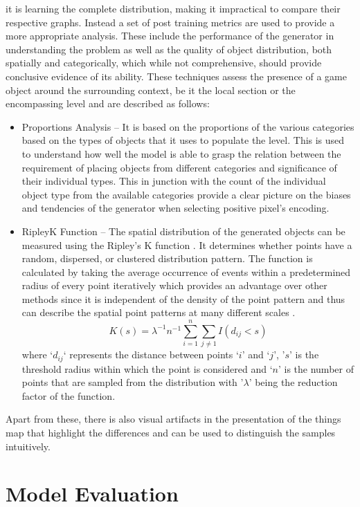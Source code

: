 \documentclass{Configuration_Files/PoliMi3i_thesis}
\begin{document}
it is learning the complete distribution, making it impractical to compare their 
respective graphs. Instead a set of post training metrics are used to provide a more 
appropriate analysis. These include the performance of the generator in 
understanding the problem as well as the quality of object distribution, both spatially 
and categorically, which while not comprehensive, should provide conclusive 
evidence of its ability. These techniques assess the presence of a game object around 
the surrounding context, be it the local section or the encompassing level and are 
described as follows:
\begin{itemize}
\item Proportions Analysis – It is based on the proportions of the various categories 
based on the types of objects that it uses to populate the level. This is used to 
understand how well the model is able to grasp the relation between the 
requirement of placing objects from different categories and significance of 
their individual types. This in junction with the count of the individual object 
type from the available categories provide a clear picture on the biases and 
tendencies of the generator when selecting positive pixel’s encoding.
\item RipleyK Function – The spatial distribution of the generated objects can be 
measured using the Ripley’s K function \cite{BdR17}. It determines whether points have 
a random, dispersed, or clustered distribution pattern. The function is 
calculated by taking the average occurrence of events within a predetermined 
radius of every point iteratively which provides an advantage over other 
methods since it is independent of the density of the point pattern and thus 
can describe the spatial point patterns at many different scales \cite{LiW15}.
\begin{equation} \label{eq:ripleyk}
K(s) = \lambda^{-1} n^{-1} \sum_{i=1}^n \sum_{j\neq 1} I(d_{ij}<s)
\end{equation}
where ‘$d_{ij}$‘ represents the distance between points ‘$i$’ and ‘$j$’, '$s$' is the threshold 
radius within which the point is considered and ‘$n$’ is the number of points 
that are sampled from the distribution with '$\lambda$' being the reduction factor 
of the function. 
\end{itemize}
Apart from these, there is also visual artifacts in the presentation of 
the things map that highlight the differences and can be used to distinguish the samples intuitively.
\newpage

\section{Model Evaluation}
\end{document}
